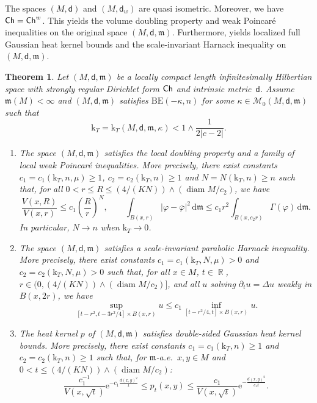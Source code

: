 \documentclass[10pt]{article}
\newcommand{\m}{\mathfrak{m}}
\newcommand{\M}{{\mathit{M}}}
\DeclareMathOperator{\diam}{diam}
\renewcommand{\d}{\,\mathrm{d}}
\newcommand{\e}{\mathrm{e}}
\renewcommand{\k}{\mathrm{k}}
\newcommand{\dist}{\mathsf{d}}
\newcommand{\Ch}{{\sf Ch}}
\DeclareMathOperator{\RR}{\mathbb{R}}
\newcommand{\BE}{{\mathrm{BE}}}
\theoremstyle{plain}
\newtheorem{theorem}{Theorem}[section]
\theoremstyle{definition}
\begin{document}
The spaces $(\M,\dist)$ and $(\M,\dist_w)$ are quasi isometric. Moreover, we have $\Ch=\Ch^w$.  This yields the volume doubling property and weak Poincar\'e inequalities on the original space $(\M,\dist,\m)$. Furthermore, \cite{Sturm95_II,Sturm-96} yields localized full Gaussian heat kernel bounds and the scale-invariant Harnack inequality on $(\M,\dist,\m)$.

\begin{theorem}\label{thm:main1}
    Let $(\M,\dist,\m)$ be a locally compact length infinitesimally Hilbertian space with strongly regular Dirichlet form $\Ch$ and intrinsic metric~$\dist$. Assume  $\m(\M)<\infty$ and  $(\M,\dist,\m)$ satisfies $\BE(-\kappa,n)$ for some $\kappa \in \mathcal{M}_0(M,\dist,\m)$ such that
\[\k_T= \k_T(M,\dist,\m,\kappa)<1\wedge \frac{1}{2|c-2|}.\]
  \begin{enumerate}
        \item
    The space $(\M,\dist,\m)$ satisfies the local doubling property and a family of local weak Poincar\'e inequalities. More precisely, there exist constants $c_1=c_1(\k_T,n,\mu)\geq 1$, $c_2=c_2(\k_T,n)\geq 1$ and $N=N(\k_T,n)\geq n$ such that, for all $0<r\leq R\leq (4/(KN))\wedge (\diam\M/c_2)$, we have
    \[
    \frac{V(x,R)}{V(x,r)}\leq c_1\left(\frac{R}{r}\right)^{N},\qquad \int_{B(x,r)}|\varphi-\bar\varphi|^2\d\m\leq c_1r^2\int_{B(x,c_2 r)}\Gamma(\varphi)\d\m.
    \]
    In particular, $N\to n$ when $\k_T\to 0$.
     \item The space $(\M,\dist,\m)$ satisfies a scale-invariant parabolic Harnack inequality. More precisely, there exist constants $c_1=c_1(\k_T,N,\mu)>0$ and $c_2=c_2(\k_T,N,\mu)>0$ such that, for all $x\in M$, $t\in\RR$, $r\in(0,(4/(KN))\wedge (\diam\M/c_2)]$, and all $u$ solving $\partial_tu=\Delta u $ weakly in $B(x,2r)$, we have 
    \[
    \sup_{[t-r^2,t-3r^2/4]\times B(x,r)} u \leq c_1 \inf_{[t-r^2/4,t]\times B(x,r)} u.
    \]
    \item The heat kernel $p$ of $(\M,\dist,\m)$ satisfies double-sided Gaussian heat kernel bounds. More precisely, there exist constants $c_1=c_1(\k_T,n)\ge 1$ and $c_2=c_2(\k_T,n)\geq 1$ such that, for $\m$-a.e.~$x,y\in \M$ and $0<t\leq (4/(KN))\wedge (\diam\M/c_2)$:
    \[
    \frac{c_1^{-1}}{V(x,\sqrt{t})}\e^{-c_1\frac{d(x,y)^2}{t}
    }
    \leq p_t(x,y)
    \leq 
    \frac{c_1}{V(x,\sqrt{t})}\e^{-\frac{d(x,y)^2}{c_1t}
    }.
    \]
    \end{enumerate}
\end{theorem}
\end{document}
